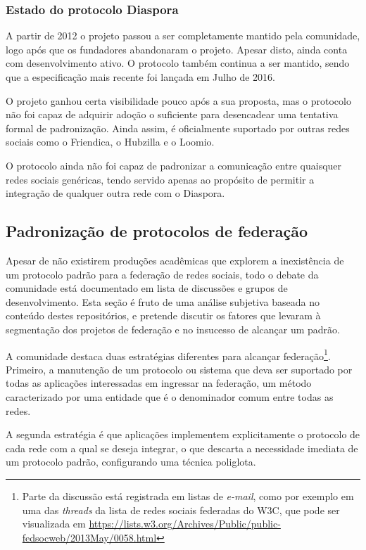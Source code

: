 \subsubsection{Estado do protocolo Diaspora}

A partir de 2012 o projeto passou a ser completamente mantido pela comunidade, logo
após que os fundadores abandonaram o projeto. Apesar disto, ainda conta com
desenvolvimento ativo. O protocolo também continua a ser mantido, sendo que a
especificação mais recente foi lançada em Julho de 2016.

O projeto ganhou certa visibilidade pouco após a sua proposta, mas o protocolo não
foi capaz de adquirir adoção o suficiente para desencadear uma tentativa formal de
padronização. Ainda assim, é oficialmente suportado por outras redes sociais como o
Friendica, o Hubzilla e o Loomio.

O protocolo ainda não foi capaz de padronizar a comunicação entre quaisquer redes
sociais genéricas, tendo servido apenas ao propósito de permitir a integração
de qualquer outra rede com o Diaspora.


\subsection{Padronização de protocolos de federação}

Apesar de não existirem produções acadêmicas que explorem a inexistência de um
protocolo padrão para a federação de redes sociais, todo o debate da comunidade está
documentado em lista de discussões e grupos de desenvolvimento. Esta seção é fruto
de uma análise subjetiva baseada no conteúdo destes repositórios, e pretende
discutir os fatores que levaram à segmentação dos projetos de federação e no
insucesso de alcançar um padrão.

A comunidade destaca duas estratégias diferentes para alcançar
federação\footnote{Parte da discussão está registrada em listas de \textit{e-mail},
como por exemplo em uma das \textit{threads} da lista de redes sociais federadas do
W3C, que pode ser visualizada em
\url{https://lists.w3.org/Archives/Public/public-fedsocweb/2013May/0058.html}}.
Primeiro, a manutenção de um protocolo ou sistema que deva ser suportado por todas
as aplicações interessadas em ingressar na federação, um método caracterizado por
uma entidade que é o denominador comum entre todas as redes.

A segunda estratégia é que aplicações implementem explicitamente o protocolo de cada
rede com a qual se deseja integrar, o que descarta a necessidade imediata de um
protocolo padrão, configurando uma técnica poliglota.

